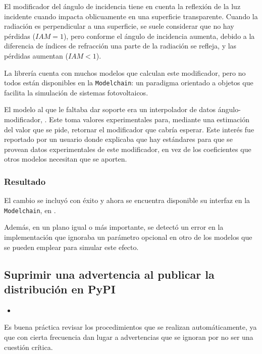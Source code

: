 El modificador del ángulo de incidencia tiene en cuenta la reflexión de la luz incidente cuando impacta oblicuamente en una superficie transparente. Cuando la radiación es perpendicular a una superficie, se suele considerar que no hay pérdidas ($IAM = 1$), pero conforme el ángulo de incidencia aumenta, debido a la diferencia de índices de refracción una parte de la radiación se refleja, y las pérdidas aumentan ($IAM < 1$).

La librería \pvlibpy{} cuenta con muchos modelos que calculan este modificador, pero no todos están disponibles en la \texttt{Modelchain}: un paradigma orientado a objetos que facilita la simulación de sistemas fotovoltaicos.

El modelo al que le faltaba dar soporte era un interpolador de datos ángulo-modificador, . Este toma valores experimentales para, mediante una estimación del valor que se pide, retornar el modificador que cabría esperar. Este interés fue reportado por un usuario donde explicaba que hay estándares para que se provean datos experimentales de este modificador, en vez de los coeficientes que otros modelos necesitan que se aporten.

\subsubsection{Resultado}

El cambio se incluyó con éxito y ahora se encuentra disponible su interfaz en la \texttt{Modelchain}, en .

Además, en un plano igual o más importante, se detectó un error en la implementación que ignoraba un \gls{parámetro} opcional en otro de los modelos que se pueden emplear para simular este efecto.

\subsection{Suprimir una advertencia al publicar la distribución en PyPI}

\begin{itemize}
    \item {}
\end{itemize}

Es buena práctica revisar los procedimientos que se realizan automáticamente, ya que con cierta frecuencia dan lugar a advertencias que se ignoran por no ser una cuestión crítica.

